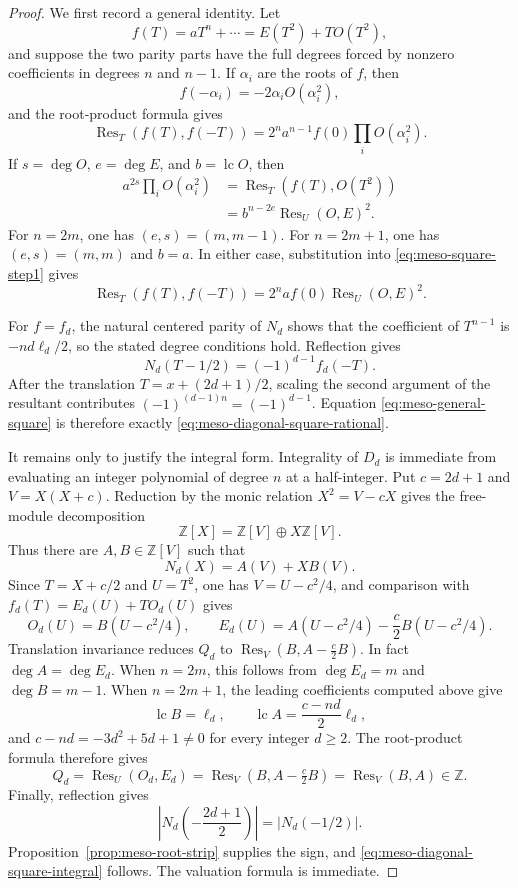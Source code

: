 \begin{proof}
We first record a general identity.  Let
\[
 f(T)=aT^n+\cdots=E(T^2)+TO(T^2),
\]
and suppose the two parity parts have the full degrees forced by nonzero
coefficients in degrees $n$ and $n-1$.  If $\alpha_i$ are the roots of
$f$, then
\[
 f(-\alpha_i)=-2\alpha_iO(\alpha_i^2),
\]
and the root-product formula gives
\begin{equation}\label{eq:meso-square-step1}
 \operatorname {Res}_T(f(T),f(-T))
 =2^na^{n-1}f(0)\prod_iO(\alpha_i^2).
\end{equation}
If $s=\deg O$, $e=\deg E$, and $b=\operatorname {lc}O$, then
\begin{align*}
 a^{2s}\prod_iO(\alpha_i^2)
 &=\operatorname {Res}_T(f(T),O(T^2))\\
 &=b^{n-2e}\operatorname {Res}_U(O,E)^2.
\end{align*}
For $n=2m$, one has $(e,s)=(m,m-1)$.  For $n=2m+1$, one has
$(e,s)=(m,m)$ and $b=a$.  In either case, substitution into
\eqref{eq:meso-square-step1} gives
\begin{equation}\label{eq:meso-general-square}
 \operatorname {Res}_T(f(T),f(-T))
 =2^na f(0)\operatorname {Res}_U(O,E)^2.
\end{equation}

For $f=f_d$, the natural centered parity of $N_d$ shows that the
coefficient of $T^{n-1}$ is $-nd\ell_d/2$, so the stated degree
conditions hold.  Reflection gives
\[
 N_d(T-1/2)=(-1)^{d-1}f_d(-T).
\]
After the translation $T=x+(2d+1)/2$, scaling the second argument of
the resultant contributes
$(-1)^{(d-1)n}=(-1)^{d-1}$.  Equation
\eqref{eq:meso-general-square} is therefore exactly
\eqref{eq:meso-diagonal-square-rational}.

It remains only to justify the integral form.  Integrality of $D_d$ is
immediate from evaluating an integer polynomial of degree $n$ at a
half-integer.  Put $c=2d+1$ and $V=X(X+c)$.  Reduction by the monic
relation $X^2=V-cX$ gives the free-module decomposition
\[
 \mathbb Z[X]=\mathbb Z[V]\oplus X\mathbb Z[V].
\]
Thus there are $A,B\in\mathbb Z[V]$ such that
\[
 N_d(X)=A(V)+XB(V).
\]
Since $T=X+c/2$ and $U=T^2$, one has $V=U-c^2/4$, and comparison with
$f_d(T)=E_d(U)+TO_d(U)$ gives
\[
 O_d(U)=B(U-c^2/4),
 \qquad
 E_d(U)=A(U-c^2/4)-\frac c2B(U-c^2/4).
\]
Translation invariance reduces $Q_d$ to
$\operatorname {Res}_V(B,A-\tfrac c2B)$.  In fact $\deg A=\deg E_d$.
When $n=2m$, this follows from $\deg E_d=m$ and $\deg B=m-1$.
When $n=2m+1$, the leading coefficients computed above give
\[
 \operatorname {lc}B=\ell_d,\qquad
 \operatorname {lc}A
 =\frac{c-nd}{2}\ell_d,
\]
and $c-nd=-3d^2+5d+1\ne0$ for every integer $d\geq2$.  The
root-product formula therefore gives
\[
 Q_d=\operatorname {Res}_U(O_d,E_d)
 =\operatorname {Res}_V(B,A-\tfrac c2B)
 =\operatorname {Res}_V(B,A)\in\mathbb Z.
\]
Finally, reflection gives
\[
 \left|N_d\left(-\frac{2d+1}{2}\right)\right|=|N_d(-1/2)|.
\]
Proposition~\ref{prop:meso-root-strip} supplies the sign, and
\eqref{eq:meso-diagonal-square-integral} follows.  The valuation formula
is immediate.
\end{proof}

